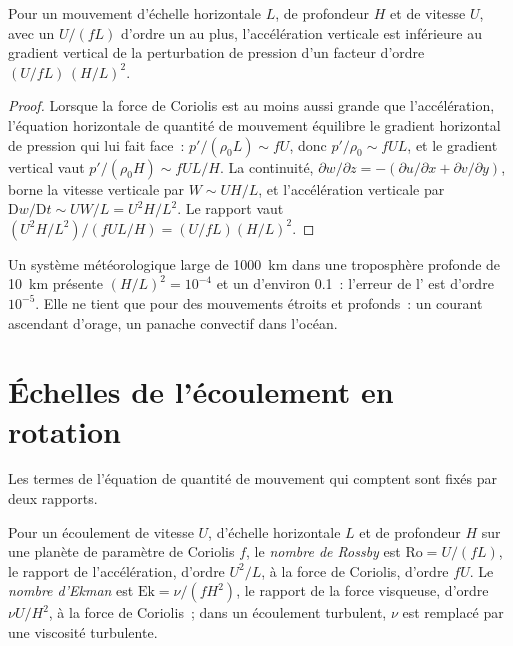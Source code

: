 \begin{proposition}\label{prop:b3:gfd-foundations:hydrostatic}
Pour un mouvement d'échelle horizontale $L$, de profondeur $H$ et de vitesse $U$, avec un
 $U/(fL)$ d'ordre un au plus, l'accélération verticale est
inférieure au gradient vertical de la perturbation de pression d'un facteur
d'ordre $(U/fL)\,(H/L)^2$.
\end{proposition}

\begin{proof}
Lorsque la force de Coriolis est au moins aussi grande que l'accélération, l'équation
horizontale de quantité de mouvement équilibre le gradient horizontal de pression
qui lui fait face~: $p'/(\rho_0 L) \sim fU$, donc $p'/\rho_0 \sim fUL$, et le
gradient vertical vaut $p'/(\rho_0 H) \sim fUL/H$. La continuité, $\partial w/\partial z
= -(\partial u/\partial x + \partial v/\partial y)$, borne la vitesse verticale
par $W \sim UH/L$, et l'accélération verticale par
$\mathrm Dw/\mathrm Dt \sim UW/L = U^2H/L^2$. Le rapport vaut $(U^2H/L^2)/(fUL/H)
= (U/fL)(H/L)^2$.
\end{proof}

Un système météorologique large de \qty{1000}{km} dans une troposphère profonde de \qty{10}{km} présente
$(H/L)^2 = 10^{-4}$ et un  d'environ 0.1~: l'erreur de
l' est d'ordre $10^{-5}$. Elle ne tient que pour des mouvements étroits et profonds~: un
courant ascendant d'orage, un panache convectif dans l'océan.

\section{Échelles de l'écoulement en rotation}\label{sec:b3:gfd-foundations:scales}

Les termes de l'équation de quantité de mouvement qui comptent sont fixés par deux rapports.

\begin{definition}\label{def:b3:gfd-foundations:numbers}
Pour un écoulement de vitesse $U$, d'échelle horizontale $L$ et de profondeur $H$ sur une planète de
paramètre de Coriolis $f$, le \emph{nombre de Rossby} est
$\mathrm{Ro} = U/(fL)$, le rapport de l'accélération, d'ordre $U^2/L$,
à la force de Coriolis, d'ordre $fU$. Le \emph{nombre
d'Ekman} est $\mathrm{Ek} = \nu/(fH^2)$, le rapport de
la force visqueuse, d'ordre $\nu U/H^2$, à la force de Coriolis~; dans un
écoulement turbulent, $\nu$ est remplacé par une viscosité turbulente.
\end{definition}

